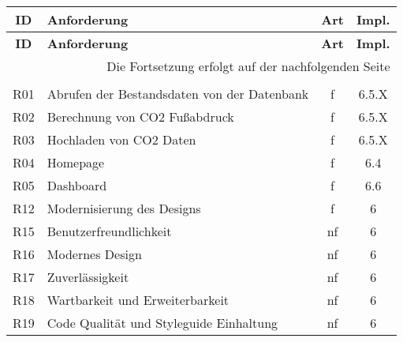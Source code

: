 \begin{longtable}{|c|l|c|c|}

    \hline
    \textbf{ID}          &
    \textbf{Anforderung} &
    \textbf{Art}         &
    \textbf{Impl.}                                                                         \\ \hline
    \endfirsthead

    \hline
    \textbf{ID}          &
    \textbf{Anforderung} &
    \textbf{Art}         &
    \textbf{Impl.}                                                                         \\ \hline
    \endhead

    \hline
    \multicolumn{4}{|r|}{{Die Fortsetzung erfolgt auf der nachfolgenden Seite}}            \\ \hline
    \endfoot

    \endlastfoot

    \multicolumn{4}{|c|}{\textbf{Muss-Anforderungen}}                                      \\ \hline

    R01                  & Abrufen der Bestandsdaten von der Datenbank        & f  & 6.5.X \\ \hline
    R02                  & Berechnung von CO2 Fußabdruck                      & f  & 6.5.X \\ \hline
    R03                  & Hochladen von CO2 Daten                            & f  & 6.5.X \\ \hline
    R04                  & Homepage                                           & f  & 6.4   \\ \hline
    R05                  & Dashboard                                          & f  & 6.6   \\ \hline
    R12                  & Modernisierung des Designs                         & f  & 6     \\ \hline
    R15                  & Benutzerfreundlichkeit                             & nf & 6     \\ \hline
    R16                  & Modernes Design                                    & nf & 6     \\ \hline
    R17                  & Zuverlässigkeit                                    & nf & 6     \\ \hline
    R18                  & Wartbarkeit und Erweiterbarkeit                    & nf & 6     \\ \hline
    R19                  & Code Qualität und Styleguide Einhaltung            & nf & 6     \\ \hline


\end{longtable}
